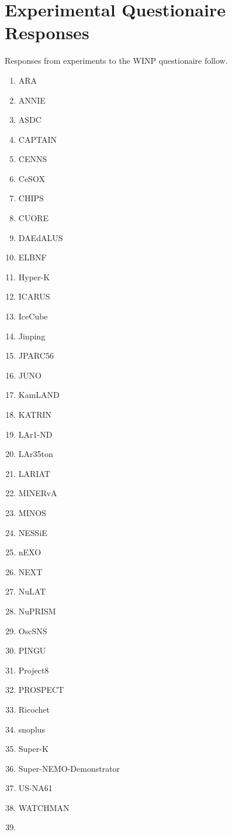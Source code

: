 \section{Experimental Questionaire Responses}
\label{sec:Experiments}

Responses from experiments to the WINP questionaire follow.

\begin{enumerate}
  \item ARA
  \item ANNIE
  \item ASDC
  \item CAPTAIN
  \item CENNS
  \item CeSOX
  \item CHIPS
  \item CUORE
  \item DAEdALUS
  \item ELBNF
  \item Hyper-K
  \item ICARUS
  \item IceCube
  \item Jinping
  \item JPARC56
  \item JUNO
  \item KamLAND
  \item KATRIN
  \item LAr1-ND
  \item LAr35ton
  \item LARIAT
  \item MINERvA
  \item MINOS
  \item NESSiE
  \item nEXO
  \item NEXT
  \item NuLAT
  \item NuPRISM
  \item OscSNS
  \item PINGU
  \item Project8
  \item PROSPECT
  \item Ricochet
  \item snoplus
  \item Super-K
  \item Super-NEMO-Demonstrator
  \item US-NA61
  \item WATCHMAN
  \item 
\end{enumerate}


